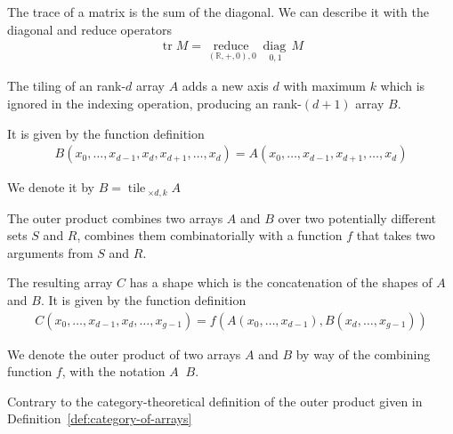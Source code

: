 \documentclass{DIKU-report-variant}
\newcommand\mrm[1]{\mathrm{#1}}
\newcommand\brm[1]{\bm{\mrm{#1}}}
\newcommand\Real{\mathbb{R}}
\newcommand\reduce{\operatorname*{\brm{reduce}\,}}
\newcommand\diag{\operatorname*{\brm{diag}\,}}
\newcommand\tile{\operatorname*{\brm{tile}\,}}
\newcommand\oprodby[1]{\mathop{\operatorname*{\,\brm{by}}_{#1}}}
\begin{document}
\begin{example}
  \label{ex:trace}
  The trace of a matrix is the sum of the diagonal. We can describe it with the diagonal
  and reduce operators
  \begin{align*}
    \operatorname*{\brm{tr}} M = \reduce_{(\Real,+,0),0} \diag_{0,1} M
  \end{align*}
\end{example}

\begin{definition}
  \label{def:tiling}
  The tiling of an rank-\(d\) array \(A\) adds a new axis \(d\) with maximum \(k\)
  which is ignored in the indexing operation, producing an rank-\((d+1)\) array \(B\).

  It is given by the function definition
  \begin{align*}
    B(x_0, \dots, x_{d-1}, x_d, x_{d+1}, \dots, x_{d}) = A(x_0, \dots, x_{d-1}, x_{d+1}, \dots, x_d)
  \end{align*}

  We denote it by \(B = \tile_{\times d, k} A\)
\end{definition}

\begin{definition}
  \label{def:outer-product}
  The outer product combines two arrays \(A\) and \(B\) over
  two potentially different sets \(S\) and \(R\), combines
  them combinatorially with a function \(f\) that takes two
  arguments from \(S\) and \(R\).

  The resulting array \(C\) has a shape which is the concatenation
  of the shapes of \(A\) and \(B\). It is given by the function definition
  \begin{align*}
    C(x_0,\dots,x_{d-1},x_d,\dots,x_{g-1}) = f(A(x_0,\dots,x_{d-1}), B(x_d,\dots,x_{g-1}))
  \end{align*}

  We denote the outer product of two arrays \(A\) and \(B\) by way of the combining
  function \(f\), with the notation \(A \oprodby f B\).
\end{definition}

\begin{remark}
  Contrary to the category-theoretical definition of the outer product given in
  Definition~\ref{def:category-of-arrays}
\end{remark}
\end{document}
